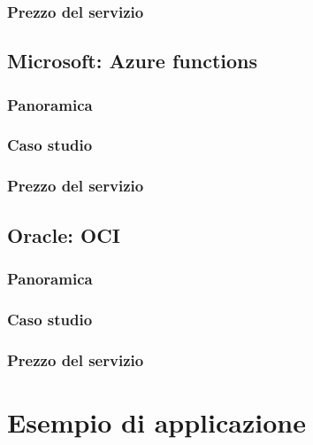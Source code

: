 \documentclass[a4paper]{article}
\begin{document}
	\subsubsection{Prezzo del servizio}
	
	\subsection{Microsoft: Azure functions}
	
	\subsubsection{Panoramica}
	
	\subsubsection{Caso studio}
	
	\subsubsection{Prezzo del servizio}
	
	\subsection{Oracle: OCI}
	
	\subsubsection{Panoramica}
	
	\subsubsection{Caso studio}
	
	\subsubsection{Prezzo del servizio}
	
	\section{Esempio di applicazione}	
\end{document}
